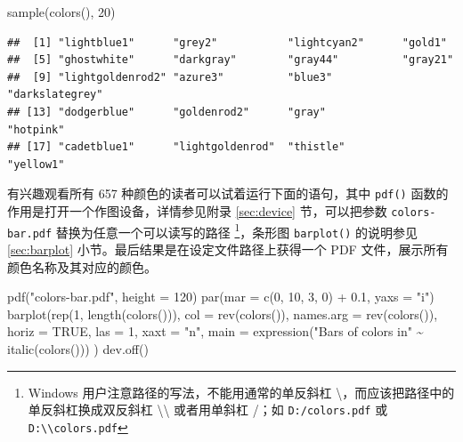 \documentclass[
  b5paper,
  UTF8,twoside]{book}
\newenvironment{Shaded}{\begin{snugshade}}{\end{snugshade}}
\newcommand{\AttributeTok}[1]{\textcolor[rgb]{0.77,0.63,0.00}{#1}}
\newcommand{\ConstantTok}[1]{\textcolor[rgb]{0.00,0.00,0.00}{#1}}
\newcommand{\DecValTok}[1]{\textcolor[rgb]{0.00,0.00,0.81}{#1}}
\newcommand{\FloatTok}[1]{\textcolor[rgb]{0.00,0.00,0.81}{#1}}
\newcommand{\FunctionTok}[1]{\textcolor[rgb]{0.00,0.00,0.00}{#1}}
\newcommand{\NormalTok}[1]{#1}
\newcommand{\SpecialCharTok}[1]{\textcolor[rgb]{0.00,0.00,0.00}{#1}}
\newcommand{\StringTok}[1]{\textcolor[rgb]{0.31,0.60,0.02}{#1}}
\begin{document}
\begin{Shaded}
\begin{Highlighting}[]
\FunctionTok{sample}\NormalTok{(}\FunctionTok{colors}\NormalTok{(), }\DecValTok{20}\NormalTok{)}
\end{Highlighting}
\end{Shaded}

\begin{verbatim}
##  [1] "lightblue1"      "grey2"           "lightcyan2"      "gold1"          
##  [5] "ghostwhite"      "darkgray"        "gray44"          "gray21"         
##  [9] "lightgoldenrod2" "azure3"          "blue3"           "darkslategrey"  
## [13] "dodgerblue"      "goldenrod2"      "gray"            "hotpink"        
## [17] "cadetblue1"      "lightgoldenrod"  "thistle"         "yellow1"
\end{verbatim}

有兴趣观看所有 657 种颜色的读者可以试着运行下面的语句，其中 \texttt{pdf()} 函数的作用是打开一个作图设备，详情参见附录 \ref{sec:device} 节，可以把参数 \texttt{\textquotesingle{}colors-bar.pdf\textquotesingle{}} 替换为任意一个可以读写的路径 \footnote{Windows 用户注意路径的写法，不能用通常的单反斜杠 \textbackslash，而应该把路径中的单反斜杠换成双反斜杠 \textbackslash\textbackslash{} 或者用单斜杠 /；如 \texttt{D:/colors.pdf} 或 \texttt{D:\textbackslash{}\textbackslash{}colors.pdf}}，条形图 \texttt{barplot()} 的说明参见 \ref{sec:barplot} 小节。最后结果是在设定文件路径上获得一个 PDF 文件，展示所有颜色名称及其对应的颜色。

\begin{Shaded}
\begin{Highlighting}[]
\FunctionTok{pdf}\NormalTok{(}\StringTok{"colors{-}bar.pdf"}\NormalTok{, }\AttributeTok{height =} \DecValTok{120}\NormalTok{)}
\FunctionTok{par}\NormalTok{(}\AttributeTok{mar =} \FunctionTok{c}\NormalTok{(}\DecValTok{0}\NormalTok{, }\DecValTok{10}\NormalTok{, }\DecValTok{3}\NormalTok{, }\DecValTok{0}\NormalTok{) }\SpecialCharTok{+} \FloatTok{0.1}\NormalTok{, }\AttributeTok{yaxs =} \StringTok{"i"}\NormalTok{)}
\FunctionTok{barplot}\NormalTok{(}\FunctionTok{rep}\NormalTok{(}\DecValTok{1}\NormalTok{, }\FunctionTok{length}\NormalTok{(}\FunctionTok{colors}\NormalTok{())),}
  \AttributeTok{col =} \FunctionTok{rev}\NormalTok{(}\FunctionTok{colors}\NormalTok{()), }\AttributeTok{names.arg =} \FunctionTok{rev}\NormalTok{(}\FunctionTok{colors}\NormalTok{()), }\AttributeTok{horiz =} \ConstantTok{TRUE}\NormalTok{,}
  \AttributeTok{las =} \DecValTok{1}\NormalTok{, }\AttributeTok{xaxt =} \StringTok{"n"}\NormalTok{, }\AttributeTok{main =} \FunctionTok{expression}\NormalTok{(}\StringTok{"Bars of colors in"} \SpecialCharTok{\textasciitilde{}} \FunctionTok{italic}\NormalTok{(}\FunctionTok{colors}\NormalTok{()))}
\NormalTok{)}
\FunctionTok{dev.off}\NormalTok{()}
\end{Highlighting}
\end{Shaded}
\end{document}
